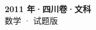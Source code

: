 \documentclass[zihao=-4, a4paper]{ctexart}
\begin{document}
\begin{center}
  {\Large\bfseries 2011 年·四川卷·文科}\\[4pt]
  {\large 数学 · 试题版}
\end{center}
\medskip
{}

\end{document}
